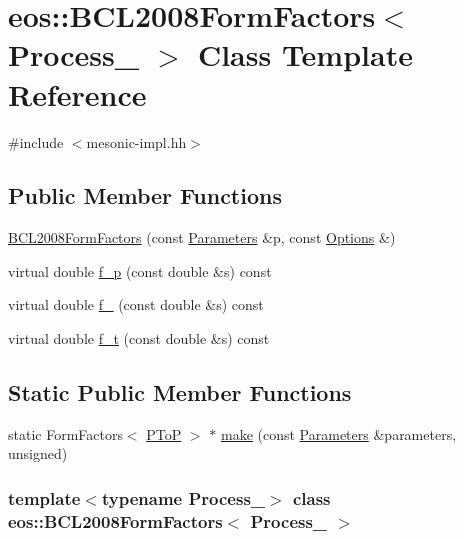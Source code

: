 \hypertarget{classeos_1_1BCL2008FormFactors}{
\section{eos::BCL2008FormFactors$<$ Process\_\- $>$ Class Template Reference}
\label{classeos_1_1BCL2008FormFactors}
}


{\ttfamily \#include $<$mesonic-\/impl.hh$>$}\subsection*{Public Member Functions}
\begin{DoxyCompactItemize}
\item 
\hyperlink{classeos_1_1BCL2008FormFactors_af715bd6b136c48edf8f31d7902158ec6}{BCL2008FormFactors} (const \hyperlink{classeos_1_1Parameters}{Parameters} \&p, const \hyperlink{classeos_1_1Options}{Options} \&)
\item 
virtual double \hyperlink{classeos_1_1BCL2008FormFactors_abddd45b1faae773718c4eb7ee2eacb9a}{f\_\-p} (const double \&s) const 
\item 
virtual double \hyperlink{classeos_1_1BCL2008FormFactors_a94ccfc9217b04b4a78a67d913cb77d64}{f\_} (const double \&s) const 
\item 
virtual double \hyperlink{classeos_1_1BCL2008FormFactors_a2e9c26cfe8867360ee8a8af4a6a649b5}{f\_\-t} (const double \&s) const 
\end{DoxyCompactItemize}
\subsection*{Static Public Member Functions}
\begin{DoxyCompactItemize}
\item 
static FormFactors$<$ \hyperlink{structeos_1_1PToP}{PToP} $>$ $\ast$ \hyperlink{classeos_1_1BCL2008FormFactors_afc38a15ec961d9677b443f9d2ca05c4a}{make} (const \hyperlink{classeos_1_1Parameters}{Parameters} \&parameters, unsigned)
\end{DoxyCompactItemize}
\subsubsection*{template$<$typename Process\_\-$>$ class eos::BCL2008FormFactors$<$ Process\_\- $>$}



